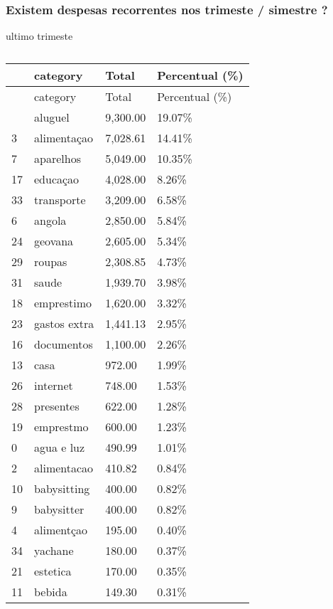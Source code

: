 \documentclass[
  8pt,
  a4paper,
  DIV=11,
  numbers=noendperiod]{scrartcl}
\begin{document}
\subsubsection{Existem despesas recorrentes nos trimeste / simestre
?}\label{existem-despesas-recorrentes-nos-trimeste-simestre}

ultimo trimeste

\begin{longtable}[]{@{}llll@{}}
\caption{}\label{T_f754f}\tabularnewline
\toprule\noalign{}
~ & category & Total & Percentual (\%) \\
\midrule\noalign{}
\endfirsthead
\toprule\noalign{}
~ & category & Total & Percentual (\%) \\
\midrule\noalign{}
\endhead
\bottomrule\noalign{}
\endlastfoot
5 & aluguel & 9,300.00 & 19.07\% \\
3 & alimentaçao & 7,028.61 & 14.41\% \\
7 & aparelhos & 5,049.00 & 10.35\% \\
17 & educaçao & 4,028.00 & 8.26\% \\
33 & transporte & 3,209.00 & 6.58\% \\
6 & angola & 2,850.00 & 5.84\% \\
24 & geovana & 2,605.00 & 5.34\% \\
29 & roupas & 2,308.85 & 4.73\% \\
31 & saude & 1,939.70 & 3.98\% \\
18 & emprestimo & 1,620.00 & 3.32\% \\
23 & gastos extra & 1,441.13 & 2.95\% \\
16 & documentos & 1,100.00 & 2.26\% \\
13 & casa & 972.00 & 1.99\% \\
26 & internet & 748.00 & 1.53\% \\
28 & presentes & 622.00 & 1.28\% \\
19 & emprestmo & 600.00 & 1.23\% \\
0 & agua e luz & 490.99 & 1.01\% \\
2 & alimentacao & 410.82 & 0.84\% \\
10 & babysitting & 400.00 & 0.82\% \\
9 & babysitter & 400.00 & 0.82\% \\
4 & alimentçao & 195.00 & 0.40\% \\
34 & yachane & 180.00 & 0.37\% \\
21 & estetica & 170.00 & 0.35\% \\
11 & bebida & 149.30 & 0.31\% \\

\end{longtable}
\end{document}
